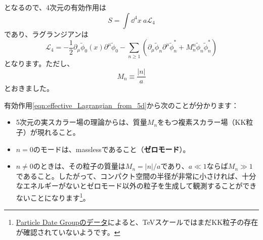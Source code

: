 \documentclass[unicode,a4paper,10pt]{ltjsarticle}
\begin{document}
となるので、4次元の有効作用は
\begin{equation}
   S
   =
   \int\dd^4 x\ a\mathcal{L}_{4}
\end{equation}
であり、ラグランジアンは
\begin{equation}
   \mathcal{L}_{4}
   =
   -\frac{1}{2}\partial_{\mu}\tilde{\phi}_{0}(x)\partial^{\mu}\tilde{\phi}_{0}
   -\sum_{n\geq 1}
   \left(  
      \partial_{\mu}\tilde{\phi}_{n}\partial^{\mu}\tilde{\phi}_{n}^{\ast}
      +
      M_{n}^{n}\tilde{\phi}_{n}\tilde{\phi}_{n}^{\ast}
   \right)
   \label{eqn:effective_Lagrangian_from_5d}
\end{equation}
となります。ただし、
\begin{equation}
   M_{n}
   \equiv
   \frac{|n|}{a}
\end{equation}
とおきました。

有効作用\eqref{eqn:effective_Lagrangian_from_5d}から次のことが分かります：
\begin{itemize}
   \item 
   5次元の実スカラー場の理論からは、質量$M_{n}$をもつ複素スカラー場（KK粒子）が現れること。
   \item 
   $n=0$のモードは、masslessであること（\textbf{ゼロモード}）。
   \item 
   $n\neq 0$のときは、その粒子の質量は$M_{n}=|n|/a$であり、$a\ll 1$ならば$M_{n}\gg 1$であること。したがって、コンパクト空間の半径が非常に小さければ、十分なエネルギーがないとゼロモード以外の粒子を生成して観測することができないことになります\footnote{
      \href{https://pdg.lbl.gov/2023/tables/rpp2023-sum-searches.pdf}{Particle Date Groupのデータ}によると、TeVスケールではまだKK粒子の存在が確認されていないようです。
   }。
\end{itemize}
\end{document}
